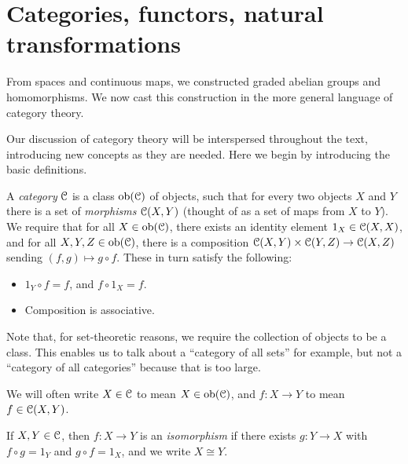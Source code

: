 \section{Categories, functors, natural transformations}\label{categories}
From spaces and continuous maps, we constructed graded abelian groups and homomorphisms. We now cast this construction in the more general language of category theory.

Our discussion of category theory will be interspersed throughout the text, introducing new concepts as they are needed. Here we begin by introducing the basic definitions.

\begin{definition}
A \emph{category} $\mathcal C$ is a class $\mathrm{ob}(\mathcal C)$ of objects, such that for every two objects $X$ and $Y$ there is a set of \emph{morphisms} $\mathcal C(X,Y)$ (thought of as a set of maps from $X$ to $Y$). We require that for all $X\in\mathrm{ob}(\mathcal C)$, there exists an identity element $1_X\in\mathcal C(X,X)$, and for all $X,Y,Z\in\mathrm{ob}(\mathcal C)$, there is a composition $\mathcal C(X,Y)\times\mathcal C(Y,Z)\to\mathcal C(X,Z)$ sending $(f,g)\mapsto g \circ f$. These in turn satisfy the following:
\begin{itemize}
\item $1_Y\circ f=f$, and $f\circ 1_X=f$.
\item Composition is associative.
\end{itemize}
\end{definition}
Note that, for set-theoretic reasons, we require the collection of objects to be a class. This enables us to talk about a ``category of all sets'' for example, but not a ``category of all categories'' because that is too large.

We will often write $X\in\mathcal C$ to mean $X\in\mathrm{ob}(\mathcal C)$, and $f\colon X\to Y$ to mean $f\in \mathcal C(X,Y)$.
\begin{definition}
If $X,Y\in \mathcal C$, then $f\colon X\to Y$ is an \emph{isomorphism} if there exists $g\colon Y\to X$ with $f \circ g=1_Y$ and $g\circ f=1_X$, and we write $X\cong Y$. 
\end{definition}

